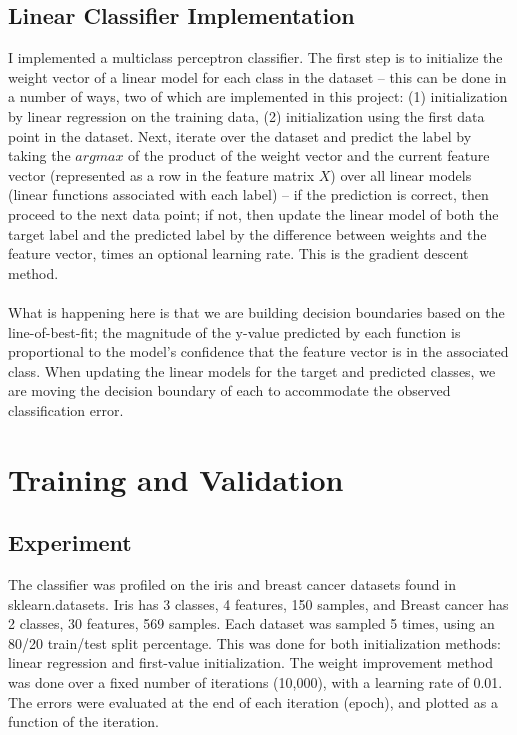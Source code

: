 \documentclass[11pt]{article}
\begin{document}
\subsection{Linear Classifier Implementation}
I implemented a multiclass perceptron classifier. The first step is to initialize the weight vector of a linear model for each class in the dataset – this can be done in a number of ways, two of which are implemented in this project: (1) initialization by linear regression on the training data, (2) initialization using the first data point in the dataset. Next, iterate over the dataset and predict the label by taking the $argmax$ of the product of the weight vector and the current feature vector (represented as a row in the feature matrix $X$) over all linear models (linear functions associated with each label) – if the prediction is correct, then proceed to the next data point; if not, then update the linear model of both the target label and the predicted label by the difference between weights and the feature vector, times an optional learning rate. This is the gradient descent method. \\ 
 \\
What is happening here is that we are building decision boundaries based on the line-of-best-fit; the magnitude of the y-value predicted by each function is proportional to the model's confidence that the feature vector is in the associated class. When updating the linear models for the target and predicted classes, we are moving the decision boundary of each to accommodate the observed classification error.

\section{Training and Validation}
\subsection{Experiment}
The classifier was profiled on the iris and breast cancer datasets found in sklearn.datasets. Iris has 3 classes, 4 features, 150 samples, and Breast cancer has 2 classes, 30 features, 569 samples. Each dataset was sampled 5 times, using an 80/20 train/test split percentage. This was done for both initialization methods: linear regression and first-value initialization. The weight improvement method was done over a fixed number of iterations (10,000), with a learning rate of 0.01. The errors were evaluated at the end of each iteration (epoch), and plotted as a function of the iteration.
\end{document}
